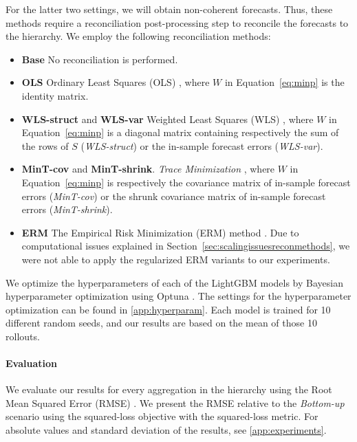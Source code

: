 \documentclass[preprint, 3p, times, twocolumn]{elsarticle}
\begin{document}
  For the latter two settings, we will obtain non-coherent forecasts. Thus, these methods require a reconciliation post-processing step to reconcile the forecasts to the hierarchy. We employ the following reconciliation methods:
  \begin{itemize}
    \item \textbf{Base} No reconciliation is performed.
    \item \textbf{OLS} Ordinary Least Squares (OLS) \cite{hyndman_optimal_2011}, where \(W\) in Equation~\eqref{eq:minp} is the identity matrix.
    \item \textbf{WLS-struct} and \textbf{WLS-var} Weighted Least Squares (WLS) \cite{wickramasuriya_optimal_2019}, where \(W\) in Equation~\eqref{eq:minp} is a diagonal matrix containing respectively the sum of the rows of \(S\) (\textit{WLS-struct}) or the in-sample forecast errors (\textit{WLS-var}).
    \item \textbf{MinT-cov} and \textbf{MinT-shrink}. \textit{Trace Minimization} \cite{wickramasuriya_optimal_2019}, where \(W\) in Equation~\eqref{eq:minp} is respectively the covariance matrix of in-sample forecast errors (\textit{MinT-cov}) or the shrunk covariance matrix of in-sample forecast errors (\textit{MinT-shrink}).
    \item \textbf{ERM} The Empirical Risk Minimization (ERM) method \cite{bentaieb_regularized_2019}. Due to computational issues explained in Section~\ref{sec:scalingissuesreconmethods}, we were not able to apply the regularized ERM variants to our experiments.
  \end{itemize}
  
  We optimize the hyperparameters of each of the LightGBM models by Bayesian hyperparameter optimization using Optuna \cite{akiba_optuna_2019}. The settings for the hyperparameter optimization can be found in \ref{app:hyperparam}. Each model is trained for 10 different random seeds, and our results are based on the mean of those 10 rollouts. 

  \paragraph{Evaluation} We evaluate our results for every aggregation in the hierarchy using the Root Mean Squared Error (RMSE) \cite{hyndman_forecasting_2021}. We present the RMSE relative to the \textit{Bottom-up} scenario using the squared-loss objective with the squared-loss metric. For absolute values and standard deviation of the results, see \ref{app:experiments}.
\end{document}
